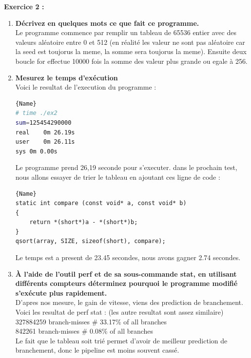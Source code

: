 \documentclass[
	a4paper, %
	10pt, %
]{CSUniSchoolLabReport}
\begin{document}
\textbf{Exercice 2 :}
\begin{enumerate}[label=\textbf{\arabic*}]

\item \textbf{Décrivez en quelques mots ce que fait ce programme.}\\
Le programme commence par remplir un tableau de 65536 entier avec des valeurs aléatoire entre 0 et 512 (en réalité les valeur ne sont pas aléatoire car la seed est toujorus la meme, la somme sera toujorus la meme).
Ensuite deux boucle for effectue 10000 fois la somme des valeur plus grande ou egale à 256.

\item \textbf{Mesurez le temps d’exécution}\\
Voici le resultat de l'execution du programme :


\begin{lstlisting}[language=bash, firstnumber=1]{Name}
# time ./ex2 
sum=125454290000
real	0m 26.19s
user	0m 26.11s
sys	0m 0.00s
\end{lstlisting}

Le programme prend 26,19 seconde pour s'executer.
dans le prochain test, nous allons essayer de trier le tableau en ajoutant ces ligne de code :
\begin{lstlisting}[style=CStyle, caption=Code modifié, firstnumber=1]{Name}
static int compare (const void* a, const void* b)
{
    return *(short*)a - *(short*)b;
}
qsort(array, SIZE, sizeof(short), compare);
\end{lstlisting}

Le temps est a present de 23.45 secondes, nous avons gagner 2.74 secondes.

\item \textbf{À l’aide de l’outil perf et de sa sous-commande stat, en utilisant différents compteurs déterminez pourquoi le programme modifié s’exécute plus rapidement.}\\

D'apres nos mesure, le gain de vitesse, viens des prediction de branchement.
Voici les resultat de perf stat : (les autre resultat sont assez similaire)\\
327884259      branch-misses             \#   33.17\% of all branches\\
842261         branch-misses             \#    0.08\% of all branches\\

Le fait que le tableau soit trié permet d'avoir de meilleur prediction de branchement, donc le pipeline est moins souvent cassé.
\end{enumerate}
\end{document}
